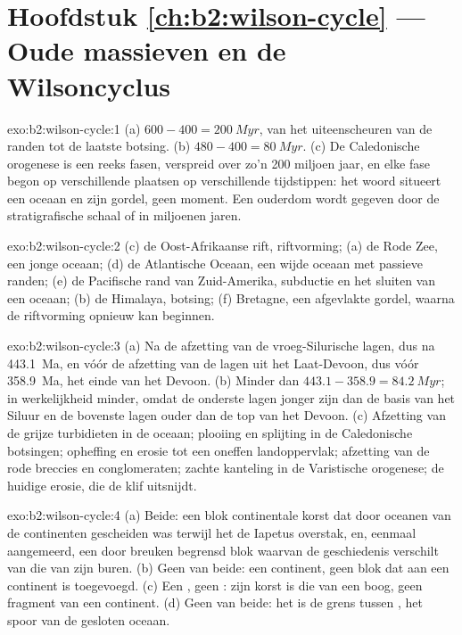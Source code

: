 \section*{Hoofdstuk \ref{ch:b2:wilson-cycle} --- Oude massieven en de Wilsoncyclus}

\begin{solution}{exo:b2:wilson-cycle:1}
(a) $600 - 400 = \qty{200}{Myr}$, van het uiteenscheuren van de randen tot de laatste botsing.
(b) $480 - 400 = \qty{80}{Myr}$. (c) De Caledonische orogenese is een reeks fasen, verspreid over
zo'n 200 miljoen jaar, en elke fase begon op verschillende plaatsen op verschillende tijdstippen: het woord
situeert een oceaan en zijn gordel, geen moment. Een ouderdom wordt gegeven door de stratigrafische schaal of in
miljoenen jaren.
\end{solution}

\begin{solution}{exo:b2:wilson-cycle:2}
(c) de Oost-Afrikaanse rift, riftvorming; (a) de Rode Zee, een jonge oceaan; (d) de Atlantische Oceaan, een wijde
oceaan met passieve randen; (e) de Pacifische rand van Zuid-Amerika, subductie en het
sluiten van een oceaan; (b) de Himalaya, botsing; (f) Bretagne, een afgevlakte gordel, waarna
de riftvorming opnieuw kan beginnen.
\end{solution}

\begin{solution}{exo:b2:wilson-cycle:3}
(a) Na de afzetting van de vroeg-Silurische lagen, dus na \qty{443.1}{Ma}, en vóór de
afzetting van de lagen uit het Laat-Devoon, dus vóór \qty{358.9}{Ma}, het einde van het Devoon.
(b) Minder dan $443.1 - 358.9 = \qty{84.2}{Myr}$; in werkelijkheid minder, omdat de onderste lagen jonger zijn
dan de basis van het Siluur en de bovenste lagen ouder dan de top van het Devoon. (c) Afzetting van de
grijze turbidieten in de oceaan; plooiing en splijting in de Caledonische botsingen; opheffing en
erosie tot een oneffen landoppervlak; afzetting van de rode breccies en conglomeraten; zachte
kanteling in de Varistische orogenese; de huidige erosie, die de klif uitsnijdt.
\end{solution}

\begin{solution}{exo:b2:wilson-cycle:4}
(a) Beide: een blok continentale korst dat door oceanen van de continenten gescheiden was terwijl het
de Iapetus overstak, en, eenmaal aangemeerd, een door breuken begrensd blok waarvan de geschiedenis verschilt van die van zijn
buren. (b) Geen van beide: een continent, geen blok dat aan een continent is toegevoegd. (c) Een , geen
: zijn korst is die van een boog, geen fragment van een continent. (d) Geen van beide: het is
de grens tussen , het spoor van de gesloten oceaan.
\end{solution}

